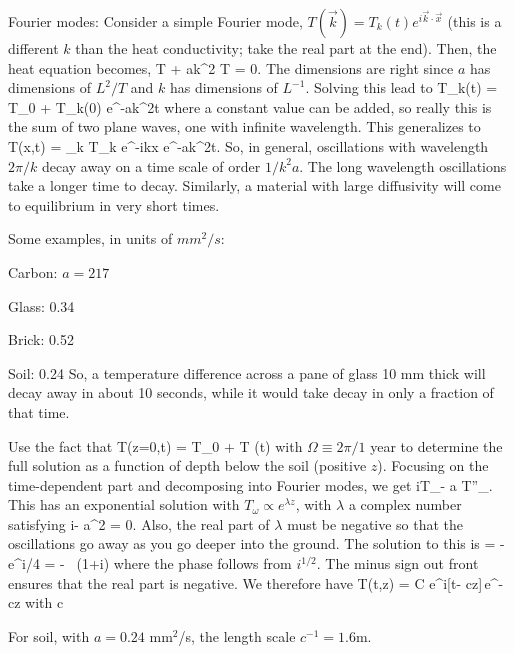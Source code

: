 \documentclass[11pt]{book}
\begin{document}
Fourier modes: Consider a simple Fourier mode, $T(\vec k) = T_k(t) e^{i\vec k \cdot \vec x}$ (this is a different $k$ than the heat conductivity; take the real part at the end). Then, the heat equation becomes,
\be
\dot T + ak^2 T = 0.\ee
The dimensions are right since $a$ has dimensions of $L^2/T$ and $k$ has dimensions of $L^{-1}$. Solving this lead to
\be
T_k(t) = T_0 + T_k(0) e^{-ak^2t}\ee
where a constant value can be added, so really this is the sum of two plane waves, one with infinite wavelength. This generalizes to
\be
T(\vec x,t) = \sum_{\vec k} T_k e^{-i\vec k\cdot\vec x} e^{-ak^2t}.\ee
So, in general, oscillations with wavelength $2\pi/k$ decay away on a time scale of order $1/k^2a$. The long wavelength oscillations take a longer time to decay. Similarly, a material with large diffusivity will come to equilibrium in very short times.

Some examples, in units of $mm^2/s$:
\bee
\item Carbon: $a=217$
\item Glass: 0.34
\item Brick: 0.52
\item Soil: 0.24
\eee
So, a temperature difference across a pane of glass 10 mm thick will decay away in about 10 seconds, while it would take decay in only a fraction of that time.

Use the fact that
\be T(z=0,t) = T_0 + \Delta T \sin(\omega t)
\ee
with $\Omega \equiv 2\pi/1$ year to determine the full solution as a function of depth below the soil (positive $z$). Focusing on the time-dependent part and decomposing into Fourier modes, we get
\be
i\omega T_\omega - a T''_.\ee
This has an exponential solution with $T_\omega \propto e^{\lambda z}$, with $\lambda$ a complex number satisfying
\be
i\omega - a\lambda^2 = 0.\ee
Also, the real part of $\lambda$ must be negative so that the oscillations go away as you go deeper into the ground. The solution to this is
\be
\lambda = -\, e^{i\pi/4} = - \, (1+i)
\ee
where the phase follows from $i^{1/2}$. The minus sign out front ensures that the real part is negative. We therefore have
\be
T(t,z) = C e^{i[\omega t- cz]}\,e^{-cz}
\ee
with
\be
c\equiv {}\ee

For soil, with $a=0.24$ mm$^2$/s, the length scale $c^{-1}= 1.6$m.

\end{document}
